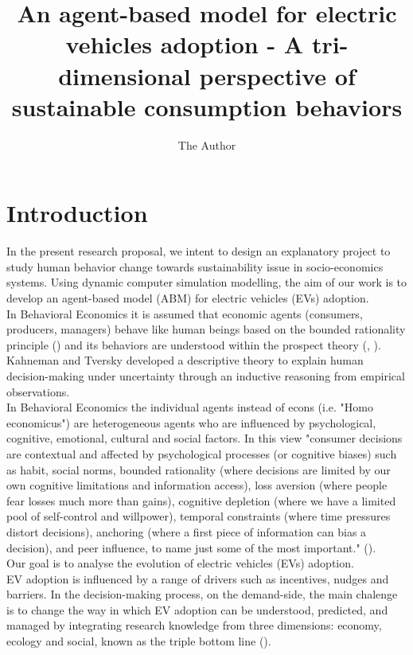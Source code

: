 \documentclass[11pt]{article} %
\title{An agent-based model for electric vehicles adoption - A tri-dimensional perspective of sustainable consumption behaviors}
\author{The Author}
\begin{document}
\maketitle



\section{Introduction}

In the present research proposal, we intent to design an explanatory project 
to study human behavior change towards sustainability issue in socio-economics systems.
Using dynamic computer simulation modelling, the aim of our work is to develop an agent-based model (ABM) 
for electric vehicles (EVs) adoption.\\

In Behavioral Economics it is assumed that  economic agents (consumers, producers, managers) 
behave like human beings based on the bounded rationality principle (\cite{Simon}) and
its behaviors are understood within the prospect theory (\cite{KahnemanTversky2}, \cite{KahnemanTversky1}). 
Kahneman and Tversky developed a descriptive theory to explain human decision-making under uncertainty
through an inductive reasoning from empirical observations.\\

In Behavioral Economics the individual agents instead of econs (i.e. "Homo economicus") are heterogeneous agents 
who are influenced by psychological, cognitive, emotional, cultural and social factors. 
In this view "consumer decisions are contextual and affected
by psychological processes (or cognitive biases) such as habit, social norms, bounded rationality
(where decisions are limited by our own cognitive limitations and information access), loss aversion
(where people fear losses much more than gains), cognitive depletion (where we have a limited
pool of self-control and willpower), temporal constraints (where time pressures distort decisions),
anchoring (where a first piece of information can bias a decision), and peer influence, to name
just some of the most important." (\cite{Rourke}).\\

Our goal is to analyse the evolution of electric vehicles (EVs) adoption.\\


EV adoption is influenced by a range of drivers such as incentives, nudges and barriers. 
In the decision-making process, on the demand-side, the main chalenge  is to change the way
 in which EV adoption can be understood, predicted, and managed 
by integrating research knowledge from three dimensions: economy, ecology and social, known as 
the triple bottom line (\cite{Elkington}). \\
\end{document}
